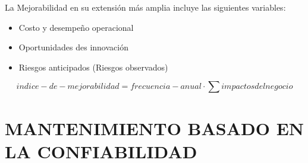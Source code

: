 \documentclass[a5paper]{book}%
\begin{document}
La Mejorabilidad en su extensión más amplia incluye las siguientes variables:

\begin{itemize}
\item Costo y desempeño operacional
\item Oportunidades des innovación
\item Riesgos anticipados (Riesgos observados)
\end{itemize}

\[ indice-de-mejorabilidad = frecuencia-anual \cdot \sum impactos del negocio\]


\section{MANTENIMIENTO BASADO EN LA CONFIABILIDAD}


%
%
\printbibliography
\end{document}
